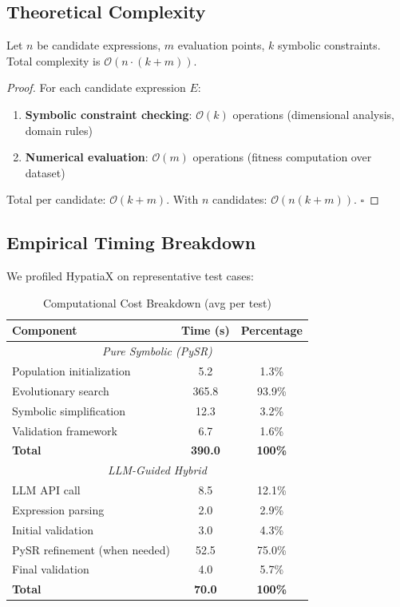 \documentclass[twoside,11pt]{article}
\newcommand{\qed}{\hfill$\square$}
\begin{document}
\subsection{Theoretical Complexity}

\begin{proposition}
Let $n$ be candidate expressions, $m$ evaluation points, $k$ symbolic constraints. Total complexity is $\mathcal{O}(n \cdot (k + m))$.
\end{proposition}

\begin{proof}
For each candidate expression $E$:
\begin{enumerate}
\item \textbf{Symbolic constraint checking}: $\mathcal{O}(k)$ operations (dimensional analysis, domain rules)
\item \textbf{Numerical evaluation}: $\mathcal{O}(m)$ operations (fitness computation over dataset)
\end{enumerate}

Total per candidate: $\mathcal{O}(k + m)$. With $n$ candidates: $\mathcal{O}(n(k + m))$. \qed
\end{proof}

\subsection{Empirical Timing Breakdown}

We profiled HypatiaX on representative test cases:

\begin{table}[H]
\centering
\caption{Computational Cost Breakdown (avg per test)}
\label{tab:timing_breakdown}
\begin{tabular}{@{}lcc@{}}
\toprule
\textbf{Component} & \textbf{Time (s)} & \textbf{Percentage} \\
\midrule
\multicolumn{3}{c}{\textit{Pure Symbolic (PySR)}} \\
\midrule
Population initialization & 5.2 & 1.3\% \\
Evolutionary search & 365.8 & 93.9\% \\
Symbolic simplification & 12.3 & 3.2\% \\
Validation framework & 6.7 & 1.6\% \\
\midrule
\textbf{Total} & \textbf{390.0} & \textbf{100\%} \\
\midrule
\multicolumn{3}{c}{\textit{LLM-Guided Hybrid}} \\
\midrule
LLM API call & 8.5 & 12.1\% \\
Expression parsing & 2.0 & 2.9\% \\
Initial validation & 3.0 & 4.3\% \\
PySR refinement (when needed) & 52.5 & 75.0\% \\
Final validation & 4.0 & 5.7\% \\
\midrule
\textbf{Total} & \textbf{70.0} & \textbf{100\%} \\
\bottomrule
\end{tabular}
\end{table}
\end{document}
